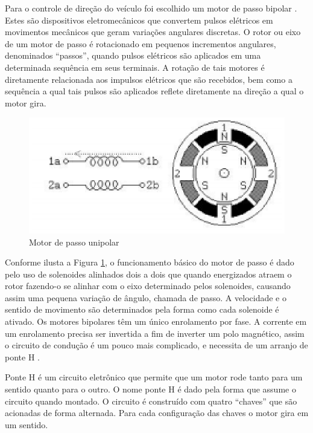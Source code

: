    Para o controle de direção do veículo foi escolhido um motor de passo bipolar \cite{brites}. Estes são dispositivos eletromecânicos que convertem pulsos elétricos em movimentos mecânicos que geram variações angulares discretas. O rotor ou eixo de um motor de passo é rotacionado em pequenos incrementos angulares, denominados “passos”, quando pulsos elétricos são aplicados em uma determinada sequência em seus terminais. A rotação de tais motores é diretamente relacionada aos impulsos elétricos que são recebidos, bem como a sequência a qual tais pulsos são aplicados reflete diretamente na direção a qual o motor gira.
    
        \begin{figure}[h]
        	\centering
        	\includegraphics[keepaspectratio=true, scale=1]{figuras/passo_unipolar.eps}
        	\caption{Motor de passo unipolar}
        	\label{fig:unipolar}
        \end{figure}
    
    Conforme ilusta a Figura \ref{fig:unipolar}, o funcionamento básico do motor de passo é dado pelo uso de solenoides alinhados dois a dois que quando energizados atraem o rotor fazendo-o se alinhar com o eixo determinado pelos solenoides, causando assim uma pequena variação de ângulo, chamada de passo. A velocidade e o sentido de movimento são determinados pela forma como cada solenoide é ativado. Os motores bipolares têm um único enrolamento por fase. A corrente em um enrolamento precisa ser invertida a fim de inverter um polo magnético, assim o circuito de condução é um pouco mais complicado, e necessita de um arranjo de ponte H \cite{brites}.
    
    Ponte H é um circuito eletrônico que permite que um motor rode tanto para um sentido quanto para o outro. O nome ponte H é dado pela forma que assume o circuito quando montado. O circuito é construído com quatro “chaves” que são acionadas de forma alternada. Para cada configuração das chaves o motor gira em um sentido.
    
